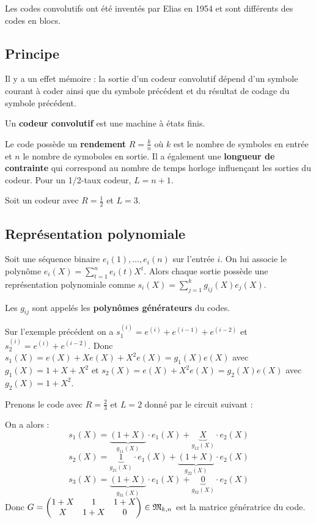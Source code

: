 Les codes convolutifs ont été inventés par Elias en 1954 et sont différents des codes en blocs.

\subsection{Principe}

	Il y a un effet mémoire : la sortie d’un codeur convolutif dépend d’un symbole courant à coder ainsi que du symbole précédent et du résultat de codage du symbole précédent.

	Un \textbf{codeur convolutif} est une machine à états finis.

	Le code possède un \textbf{rendement} $R = \frac{k}{n}$ où $k$ est le nombre de symboles en entrée et $n$ le nombre de symoboles en sortie.
	Il a également une \textbf{longueur de contrainte} qui correspond au nombre de temps horloge influençant les sorties du codeur.
	Pour un 1/2-taux codeur, $L = n + 1$.

	\begin{ex}
		Soit un codeur avec $R = \frac{1}{2}$ et $L = 3$.
		
	\end{ex}

\subsection{Représentation polynomiale}

	Soit une séquence binaire $e_i(1),\ldots,e_i(n)$ sur l'entrée $i$.
	On lui associe le polynôme $e_i(X) = \sum_{t = 1}^n e_i(t) X^t$.
	Alors chaque sortie possède une représentation polynomiale comme $s_i(X) = \sum_{j = 1}^k g_{ij}(X) e_j(X)$.
	
	Les $g_{ij}$ sont appelés les \textbf{polynômes générateurs} du codes.

	\begin{ex}
		Sur l'exemple précédent on a $s_1^{(i)} = e^{(i)} + e^{(i - 1)} + e^{(i - 2)}$ et $s_2^{(i)} = e^{(i)} + e^{(i - 2)}$.
		Donc $s_1(X) = e(X) + X e(X) + X^2 e(X) = g_1(X) e(X)$ avec $g_1(X) = 1 + X + X^2$ et $s_2(X) = e(X) + X^2 e(X) = g_2(X) e(X)$ avec $g_2(X) = 1 + X^2$.
	\end{ex}
	
	\begin{ex}
		Prenons le code avec $R = \frac{2}{3}$ et $L = 2$ donné par le circuit suivant :
		
		On a alors :
		$$s_1(X) = \underset{g_{11}(X)}{\underbrace{(1 + X)}} \cdot e_1(X) + \underset{g_{12}(X)}{\underbrace{X}} \cdot e_2(X)$$
		$$s_2(X) = \underset{g_{21}(X)}{\underbrace{1}} \cdot e_1(X) + \underset{g_{22}(X)}{\underbrace{(1 + X)}} \cdot e_2(X)$$
		$$s_3(X) = \underset{g_{31}(X)}{\underbrace{(1 + X)}} \cdot e_1(X) + \underset{g_{32}(X)}{\underbrace{0}} \cdot e_2(X)$$
		Donc $G = \begin{pmatrix}
			1 + X & 1 & 1 + X \\
			X & 1 + X & 0
			\end{pmatrix} \in \mathfrak{M}_{k,n}$
		est la matrice génératrice du code.
	\end{ex}

